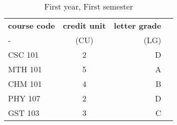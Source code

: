 \documentclass{article}
\begin{document}
\begin{table}[h!]
	\begin{center}
		\caption{First year, First semester}
		\label{tab:table1}
		\begin{tabular}{l|c|r|c}
		\textbf{course code} & \textbf{credit unit} &
		\textbf{letter grade}\\ 
		- & (CU) & (LG)\\
		\hline 
		CSC 101 & 2 & D\\
		MTH 101 & 5 & A\\
		CHM 101 & 4 & B\\
		PHY 107 & 2 & D\\
		GST 103 & 3 & C\\
		
		
		\end{tabular}
	\end{center}
\end{table}
\end{document}
